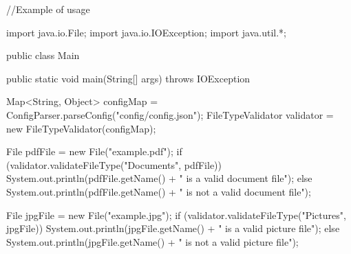 //\+Example of usage \begin{DoxyVerb}import java.io.File;
import java.io.IOException;
import java.util.*;

    public class Main {
    public static void main(String[] args) throws IOException {
    Map<String, Object> configMap = ConfigParser.parseConfig("config/config.json");
    FileTypeValidator validator = new FileTypeValidator(configMap);

            File pdfFile = new File("example.pdf");
            if (validator.validateFileType("Documents", pdfFile)) {
                System.out.println(pdfFile.getName() + " is a valid document file");
            } else {
                System.out.println(pdfFile.getName() + " is not a valid document file");
            }

            File jpgFile = new File("example.jpg");
            if (validator.validateFileType("Pictures", jpgFile)) {
                System.out.println(jpgFile.getName() + " is a valid picture file");
            } else {
                System.out.println(jpgFile.getName() + " is not a valid picture file");
            }
        }
    }
\end{DoxyVerb}
 